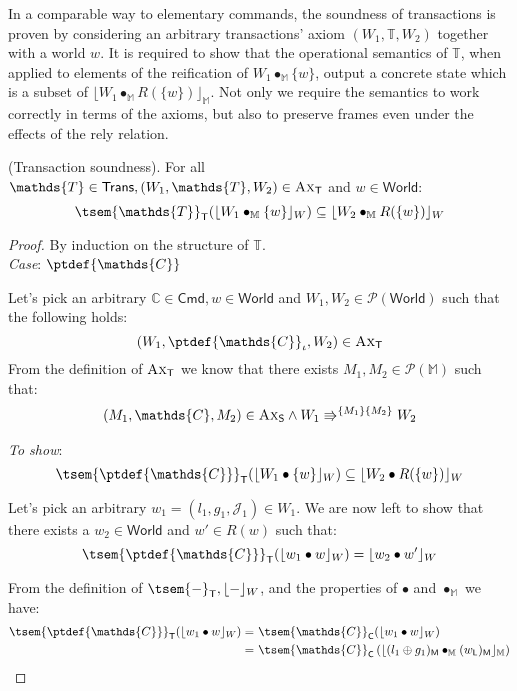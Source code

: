 In a comparable way to elementary commands, the soundness of transactions is proven by considering an arbitrary transactions' axiom $(W_1, \mathds{T}, W_2)$ together with a world $w$. It is required to show that the operational semantics of $\mathds{T}$, when applied to elements of the reification of $W_1 \bullet_\mathbb{M} \{w\}$, output a concrete state which is a subset of $\lfloor W_1 \bullet_\mathbb{M} R(\{w\}) \rfloor_\mathbb{M}$. Not only we require the semantics to work correctly in terms of the axioms, but also to preserve frames even under the effects of the rely relation. 
\begin{thm}
	\label{thm:soundTrans}
	(Transaction soundness).
	For all $\mathds{T} \in \mathsf{Trans}, (W_1, \mathds{T}, W_2) \in \textsc{Ax}_\mathsf{T}$ and $w \in \mathsf{World}$:
	\[
		\tsem{\mathds{T}}_\mathsf{T}(\lfloor W_1 \bullet_\mathbb{M} \{ w \} \rfloor_W) \subseteq \lfloor W_2 \bullet_\mathbb{M} R(\{ w \}) \rfloor_W
	\]
	
	{\parindent0pt
	\begin{proof}
	By induction on the structure of $\mathds{T}$. \\	
	
	\textit{Case}: $\ptdef{\mathds{C}}$
	
	Let's pick an arbitrary $\mathds{C} \in \mathsf{Cmd}, w \in \mathsf{World}$ and $W_1, W_2 \in \mathcal{P}(\mathsf{World})$ such that the following holds:
	\[
		(W_1, \ptdef{\mathds{C}}_\iota, W_2) \in \textsc{Ax}_\mathsf{T}
	\]
	From the definition of $\textsc{Ax}_\mathsf{T}$ we know that there exists $M_1, M_2 \in \mathcal{P}(\mathbb{M})$ such that:
	\begin{gather}\label{tsound:1}
		(M_1, \mathds{C}, M_2) \in \textsc{Ax}_\mathsf{S} \land W_1 \Rrightarrow^{\{M_1\}\{M_2\}} W_2
	\end{gather}
	
	\textit{To show}:
	\[
		\tsem{\ptdef{\mathds{C}}}_\mathsf{T}(\lfloor W_1 \bullet \{w\} \rfloor_W) \subseteq \lfloor W_2 \bullet R(\{w\}) \rfloor_W
	\]
	
	Let's pick an arbitrary $w_1 = (l_1, g_1, \mathcal{J}_1) \in W_1$. We are now left to show that there exists a $w_2 \in \mathsf{World}$ and $w' \in R(w)$ such that:
	\[
		\tsem{\ptdef{\mathds{C}}}_\mathsf{T}(\lfloor w_1 \bullet w \rfloor_W) = \lfloor w_2 \bullet w' \rfloor_W
	\]
	
	From the definition of $\tsem{-}_\mathsf{T}, \lfloor - \rfloor_W$, and the properties of $\bullet$ and $\bullet_\mathbb{M}$ we have:
	\begin{align}
		\tsem{\ptdef{\mathds{C}}}_\mathsf{T}(\lfloor w_1 \bullet w \rfloor_W) =\
			&\tsem{\mathds{C}}_\mathsf{C}(\lfloor w_1 \bullet w \rfloor_W) \\
			\label{tsound:2} =\ &\tsem{\mathds{C}}_\mathsf{C}\left( \lfloor (l_1 \oplus g_1)_\mathsf{M} \bullet_\mathbb{M} (w_\mathsf{L})_\mathsf{M} \rfloor_\mathbb{M} \right)
	\end{align}
	

\end{proof}}
\end{thm}

